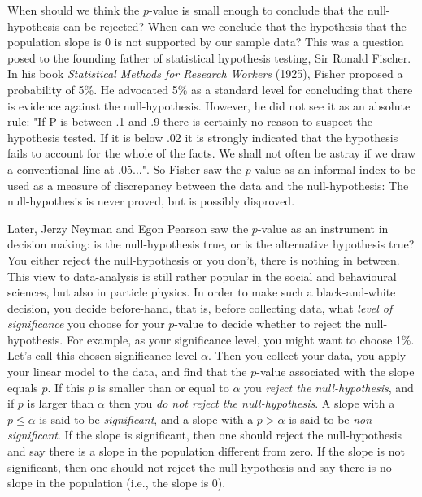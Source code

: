\documentclass[]{report}\usepackage[]{graphicx}\usepackage[]{color}
\begin{document}
When should we think the $p$-value is small enough to conclude that the null-hypothesis can be rejected? When can we conclude that the hypothesis that the population slope is 0 is not supported by our sample data? This was a question posed to the founding father of statistical hypothesis testing, Sir Ronald Fischer. In his book \textit{Statistical Methods for Research Workers} (1925), Fisher proposed a probability of 5\%. He advocated 5\% as a standard level for concluding that there is evidence against the null-hypothesis. However, he did not see it as an absolute rule: "If P is between .1 and .9 there is certainly no reason to suspect the hypothesis tested. If it is below .02 it is strongly indicated that the hypothesis fails to account for the whole of the facts. We shall not often be astray if we draw a conventional line at .05...". So Fisher saw the $p$-value as an informal index to be used as a measure of discrepancy between the data and the null-hypothesis: The null-hypothesis is never proved, but is possibly disproved.


Later, Jerzy Neyman and Egon Pearson saw the $p$-value as an instrument in decision making: is the null-hypothesis true, or is the alternative hypothesis true? You either reject the null-hypothesis or you don't, there is nothing in between. This view to data-analysis is still rather popular in the social and behavioural sciences, but also in particle physics. In order to make such a black-and-white decision, you decide before-hand, that is, before collecting data, what \textit{level of significance} you choose for your $p$-value to decide whether to reject the null-hypothesis. For example, as your significance level, you might want to choose 1\%. Let's call this chosen significance level $\alpha$. Then you collect your data, you apply your linear model to the data, and find that the $p$-value associated with the slope  equals $p$. If this $p$ is smaller than or equal to $\alpha$ you \textit{reject the null-hypothesis}, and if $p$ is larger than $\alpha$ then you \textit{do not reject the null-hypothesis}. A slope with a $p \leq \alpha$ is said to be \textit{significant}, and a slope with a $p > \alpha$ is said to be \textit{non-significant}. If the slope is significant, then one should reject the null-hypothesis and say there is a slope in the population different from zero. If the slope is not significant, then one should not reject the null-hypothesis and say there is no slope in the population (i.e., the slope is 0).
\end{document}
